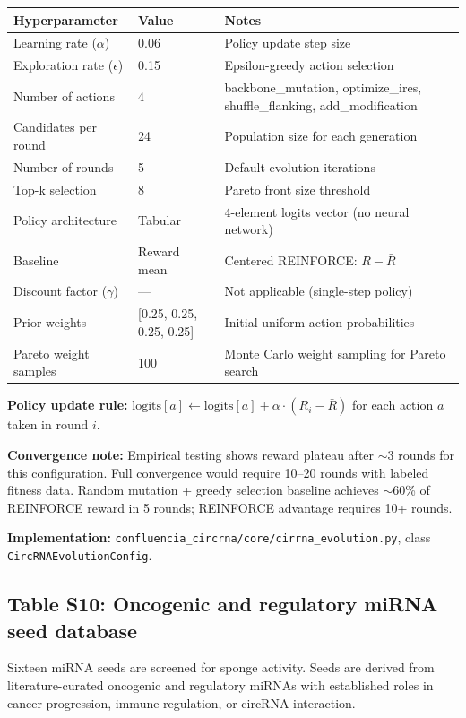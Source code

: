 \begin{tabular}{lll}
\toprule
\textbf{Hyperparameter} & \textbf{Value} & \textbf{Notes} \\
\midrule
Learning rate ($\alpha$) & 0.06 & Policy update step size \\
Exploration rate ($\epsilon$) & 0.15 & Epsilon-greedy action selection \\
Number of actions & 4 & backbone\_mutation, optimize\_ires, shuffle\_flanking, add\_modification \\
Candidates per round & 24 & Population size for each generation \\
Number of rounds & 5 & Default evolution iterations \\
Top-k selection & 8 & Pareto front size threshold \\
Policy architecture & Tabular & 4-element logits vector (no neural network) \\
Baseline & Reward mean & Centered REINFORCE: $R - \bar{R}$ \\
Discount factor ($\gamma$) & --- & Not applicable (single-step policy) \\
Prior weights & [0.25, 0.25, 0.25, 0.25] & Initial uniform action probabilities \\
Pareto weight samples & 100 & Monte Carlo weight sampling for Pareto search \\
\bottomrule
\end{tabular}

\textbf{Policy update rule:} $\text{logits}[a] \leftarrow \text{logits}[a] + \alpha \cdot (R_i - \bar{R})$ for each action $a$ taken in round $i$.

\textbf{Convergence note:} Empirical testing shows reward plateau after $\sim$3 rounds for this configuration. Full convergence would require 10--20 rounds with labeled fitness data. Random mutation + greedy selection baseline achieves $\sim$60\% of REINFORCE reward in 5 rounds; REINFORCE advantage requires 10+ rounds.

\textbf{Implementation:} \texttt{confluencia\_circrna/core/cirrna\_evolution.py}, class \texttt{CircRNAEvolutionConfig}.

\subsection*{Table S10: Oncogenic and regulatory miRNA seed database}

\small Sixteen miRNA seeds are screened for sponge activity. Seeds are derived from literature-curated oncogenic and regulatory miRNAs with established roles in cancer progression, immune regulation, or circRNA interaction.

